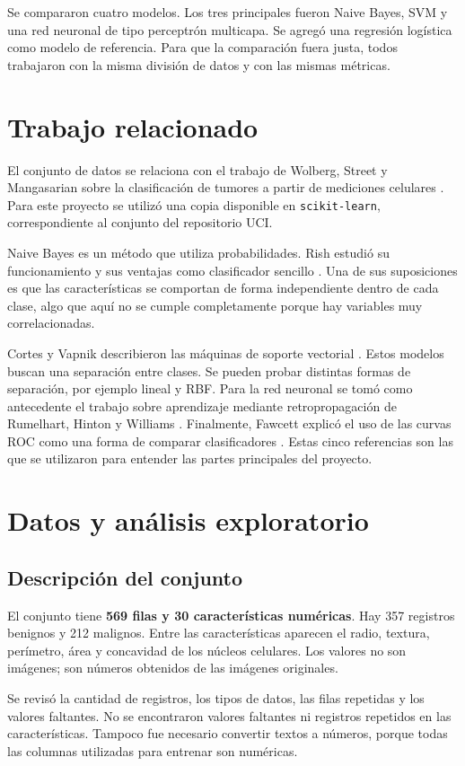 \documentclass[conference]{IEEEtran}
\begin{document}
Se compararon cuatro modelos. Los tres principales fueron Naive Bayes, SVM y una red neuronal de tipo perceptrón multicapa. Se agregó una regresión logística como modelo de referencia. Para que la comparación fuera justa, todos trabajaron con la misma división de datos y con las mismas métricas.

\section{Trabajo relacionado}
El conjunto de datos se relaciona con el trabajo de Wolberg, Street y Mangasarian sobre la clasificación de tumores a partir de mediciones celulares \cite{wolberg}. Para este proyecto se utilizó una copia disponible en \texttt{scikit-learn}, correspondiente al conjunto del repositorio UCI.

Naive Bayes es un método que utiliza probabilidades. Rish estudió su funcionamiento y sus ventajas como clasificador sencillo \cite{rish}. Una de sus suposiciones es que las características se comportan de forma independiente dentro de cada clase, algo que aquí no se cumple completamente porque hay variables muy correlacionadas.

Cortes y Vapnik describieron las máquinas de soporte vectorial \cite{cortes}. Estos modelos buscan una separación entre clases. Se pueden probar distintas formas de separación, por ejemplo lineal y RBF. Para la red neuronal se tomó como antecedente el trabajo sobre aprendizaje mediante retropropagación de Rumelhart, Hinton y Williams \cite{rumelhart}. Finalmente, Fawcett explicó el uso de las curvas ROC como una forma de comparar clasificadores \cite{fawcett}. Estas cinco referencias son las que se utilizaron para entender las partes principales del proyecto.

\section{Datos y análisis exploratorio}
\subsection{Descripción del conjunto}
El conjunto tiene \textbf{569 filas y 30 características numéricas}. Hay 357 registros benignos y 212 malignos. Entre las características aparecen el radio, textura, perímetro, área y concavidad de los núcleos celulares. Los valores no son imágenes; son números obtenidos de las imágenes originales.

Se revisó la cantidad de registros, los tipos de datos, las filas repetidas y los valores faltantes. No se encontraron valores faltantes ni registros repetidos en las características. Tampoco fue necesario convertir textos a números, porque todas las columnas utilizadas para entrenar son numéricas.
\end{document}
